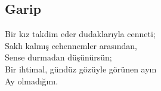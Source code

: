 \subsection{Garip}

Bir kız takdim eder dudaklarıyla cenneti; \\
Saklı kalmış cehennemler arasından, \\
Sense durmadan düşünürsün; \\
Bir ihtimal, gündüz gözüyle görünen ayın \\
Ay olmadığını. \\